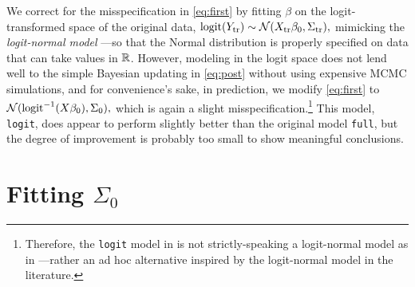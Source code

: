 \documentclass[12pt]{article}
\newcommand{\logit}{\operatorname{logit}}
\begin{document}
We correct for the
misspecification in \eqref{eq:first} by fitting $\beta$ on the logit-transformed
space of the original data, $
\logit(Y_\text{tr}) \sim \Norm(X_\text{tr}\beta_0, \Sigma_\text{tr}),
$
mimicking the \emph{logit-normal model} \cite[page 283]{agresti2015foundations}---so that the Normal distribution is properly specified on data that can take values in $\mathbb{R}$. However, modeling in the logit space does not lend well to the simple Bayesian updating in \eqref{eq:post} without using expensive MCMC simulations, and for convenience's sake, in prediction, we modify \eqref{eq:first} to $\Norm(\logit^{-1}(X\beta_0), \Sigma_0),$ which is again a slight misspecification.\footnote{Therefore, the \texttt{logit} model in  is not strictly-speaking a logit-normal model as in \cite{agresti2015foundations}---rather an ad hoc alternative inspired by the logit-normal model in the literature.} This model, \texttt{logit}, does appear to perform slightly better than the original model \texttt{full}, but the degree of improvement is probably too small to show meaningful conclusions.  


\section{Fitting $\Sigma_0$}
\label{sec:sigma}
\end{document}
